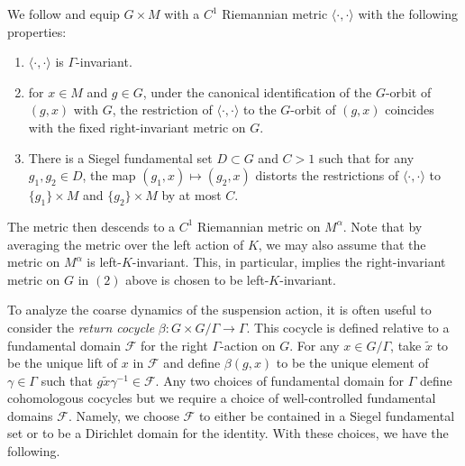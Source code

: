 \documentclass[10pt,reqno]{amsart}
\theoremstyle{Theorem}
\theoremstyle{definition}
\theoremstyle{remark}
\newcommand{\note}[1]{\marginpar{{\color{red}\footnotesize \begin{spacing}{1}#1\end{spacing}}}}
\def\calF{\mathcal F}
\def\blue{}
\begin{document}
We follow  \cite[Section  2.1]{AWBFRHZW-latticemeasure} and equip $G\times M$ with a $C^1$ Riemannian metric $\langle \cdot, \cdot \rangle$ with the following properties:
\begin{enumerate}
\item $\langle \cdot, \cdot \rangle$ is $\Gamma$-invariant.
\item for $x\in M$ and $g\in G$, under the canonical identification of the $G$-orbit of $(g,x)$ with $G$, the restriction of $\langle \cdot, \cdot \rangle$ to the   $G$-orbit of $(g,x)$  coincides with the fixed right-invariant metric on $G$.
\item There is a Siegel fundamental set $D\subset G$ and $C>1$ such that for any $g_1,g_2\in D$, the map $(g_1,x)\mapsto (g_2,x)$ distorts the restrictions of $\langle \cdot, \cdot \rangle$ to $\{g_1\} \times M$ and $\{g_2\} \times M$  by at most $C$.
\end{enumerate}
The metric then descends to a $C^1$ Riemannian metric on $M^\alpha$.  {\blue Note that by averaging the metric over the left action of $K$, we may also assume that the metric on $M^\alpha$ is left-$K$-invariant.   This, in particular, implies the right-invariant metric on $G$ in $(2)$ above is chosen to be left-$K$-invariant.} %


To analyze the coarse dynamics of the suspension action, it is often useful to consider the \emph{return cocycle}
$\beta\colon G \times G/\Gamma \rightarrow \Gamma$.  This cocycle is defined relative to a fundamental
domain $\calF$ for the right $\Gamma$-action on $G$.  For any $x\in G/\Gamma$, take $\tilde x$ to be the unique
lift of $x$ in $\calF$ and define $\beta(g,x)$ to be the unique element of $\gamma\in \Gamma$ such that
$g\tilde{x}\gamma^{-1} \in \mathcal F$.  Any two choices of fundamental domain for $\Gamma$
define cohomologous cocycles but we require a choice of well-controlled fundamental domains $\calF$.  Namely, we choose $\calF$ to either be contained in a Siegel fundamental set or to be a Dirichlet domain for the identity.  With these choices, we have the following.
\end{document}
